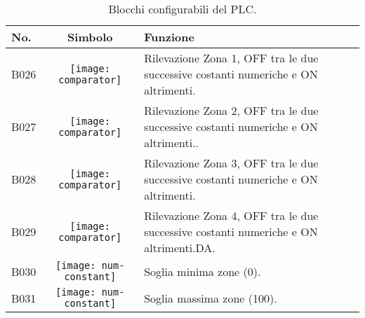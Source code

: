 \begin{table}[htbp]\centering
    \caption{Blocchi configurabili del PLC.}
    \begin{tabularx}{\columnwidth}{@{}lcX@{}}\toprule
        \textbf{No.} & \textbf{Simbolo}                           & \textbf{Funzione}                                                                    \\ \midrule
        B026         & \texttt{[image: comparator]}   & Rilevazione Zona 1, OFF tra le due successive costanti numeriche e ON altrimenti.    \\
        B027         & \texttt{[image: comparator]}   & Rilevazione Zona 2, OFF tra le due successive costanti numeriche e ON altrimenti..   \\
        B028         & \texttt{[image: comparator]}   & Rilevazione Zona 3, OFF tra le due successive costanti numeriche e ON altrimenti.    \\
        B029         & \texttt{[image: comparator]}   & Rilevazione Zona 4, OFF tra le due successive costanti numeriche e ON altrimenti.DA. \\
        B030         & \texttt{[image: num-constant]} & Soglia minima zone (0).                                                              \\
        B031         & \texttt{[image: num-constant]} & Soglia massima zone (100).                                                           \\
    \bottomrule\end{tabularx}
\end{table}

